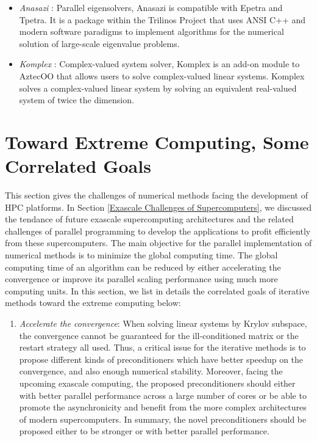{\begin{itemize}
	\item \textit{Anasazi} \cite{baker2009anasazi}: Parallel eigensolvers, Anasazi is compatible with Epetra and Tpetra. It is a package within the Trilinos Project that uses ANSI C++ and modern software paradigms to implement algorithms for the numerical solution of large-scale eigenvalue problems.
	
	\item \textit{Komplex} \cite{day2001solving}: Complex-valued system solver, Komplex is an add-on module to AztecOO that allows users to solve complex-valued linear systems. Komplex solves a complex-valued linear system by solving an equivalent real-valued system of twice the dimension.
\end{itemize}

\section{Toward Extreme Computing, Some Correlated Goals}\label{Toward Extreme Computing, Some Correlated Goals}

This section gives the challenges of numerical methods facing the development of HPC platforms. In Section \ref{Exascale Challenges of Supercomputers}, we discussed the tendance of future exascale supercomputing architectures and the related challenges of parallel programming to develop the applications to profit efficiently from these supercomputers. The main objective for the parallel implementation of numerical methods is to minimize the global computing time. The global computing time of an algorithm can be reduced by either accelerating the convergence or improve its parallel scaling performance using much more computing units. In this section, we list in details the correlated goals of iterative methods toward the extreme computing below:

\begin{enumerate}[label=(\arabic*)]
	
    \item \textit{Accelerate the convergence}: When solving linear systems by Krylov subspace, the convergence cannot be guaranteed for the ill-conditioned matrix or the restart strategy all used. Thus, a critical issue for the iterative methods is to propose different kinds of preconditioners which have better speedup on the convergence, and also enough numerical stability. Moreover, facing the upcoming exascale computing, the proposed preconditioners should either with better parallel performance across a large number of cores or be able to promote the asynchronicity and benefit from the more complex architectures of modern supercomputers. In summary, the novel preconditioners should be proposed either to be stronger or with better parallel performance.
	

\end{enumerate}}
